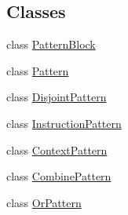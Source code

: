 \subsection*{Classes}
\begin{DoxyCompactItemize}
\item 
class \mbox{\hyperlink{class_pattern_block}{Pattern\+Block}}
\item 
class \mbox{\hyperlink{class_pattern}{Pattern}}
\item 
class \mbox{\hyperlink{class_disjoint_pattern}{Disjoint\+Pattern}}
\item 
class \mbox{\hyperlink{class_instruction_pattern}{Instruction\+Pattern}}
\item 
class \mbox{\hyperlink{class_context_pattern}{Context\+Pattern}}
\item 
class \mbox{\hyperlink{class_combine_pattern}{Combine\+Pattern}}
\item 
class \mbox{\hyperlink{class_or_pattern}{Or\+Pattern}}
\end{DoxyCompactItemize}

